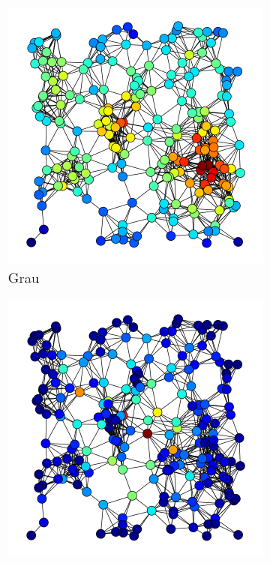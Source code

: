 \begin{figure}[ht]
    \centering
    \vspace*{0.4cm}
    \begin{subfigure}{0.27\textwidth}
        \includegraphics[width=\linewidth]{imagens/degree.png}
        \caption{Grau} \label{fig:degree}
    \end{subfigure}
    \begin{subfigure}{0.27\textwidth}
        \includegraphics[width=\linewidth]{imagens/betweenness.png}

\end{subfigure}
\end{figure}
